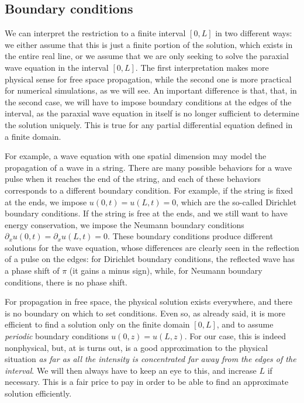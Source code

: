 \documentclass[a4paper,10pt]{report}
\begin{document}
\subsection{Boundary conditions}

We can interpret the restriction to a finite interval $[0, L]$ in two different ways: we either assume that this is just a finite portion of the solution, which exists in the entire real line, or we assume that we are only seeking to solve the paraxial wave equation in the interval $[0, L]$. The first interpretation makes more physical sense for free space propagation, while the second one is more practical for numerical simulations, as we will see. An important difference is that, that, in the second case, we will have to impose boundary conditions at the edges of the interval, as the paraxial wave equation in itself is no longer sufficient to determine the solution uniquely. This is true for any partial differential equation defined in a finite domain. 

For example, a wave equation with one spatial dimension may model the propagation of a wave in a string. There are many possible behaviors for a wave pulse when it reaches the end of the string, and each of these behaviors corresponds to a different boundary condition. For example, if the string is fixed at the ends, we impose $u(0,t) = u(L,t) = 0$, which are the so-called Dirichlet boundary conditions. If the string is free at the ends, and we still want to have energy conservation, we impose the Neumann boundary conditions $\partial_x u(0,t) = \partial_x u(L,t) = 0$. These boundary conditions produce different solutions for the wave equation, whose differences are clearly seen in the reflection of a pulse on the edges: for Dirichlet boundary conditions, the reflected wave has a phase shift of $\pi$ (it gains a minus sign), while, for Neumann boundary conditions, there is no phase shift.

For propagation in free space, the physical solution exists everywhere, and there is no boundary on which to set conditions. Even so, as already said, it is more efficient to find a solution only on the finite domain $[0,L]$, and to assume \textit{periodic} boundary conditions $u(0,z) = u(L,z)$. For our case, this is indeed nonphysical, but, at is turns out, is a good approximation to the physical situation \textit{as far as all the intensity is concentrated far away from the edges of the interval}. We will then always have to keep an eye to this, and increase $L$ if necessary. This is a fair price to pay in order to be able to find an approximate solution efficiently.
\end{document}
